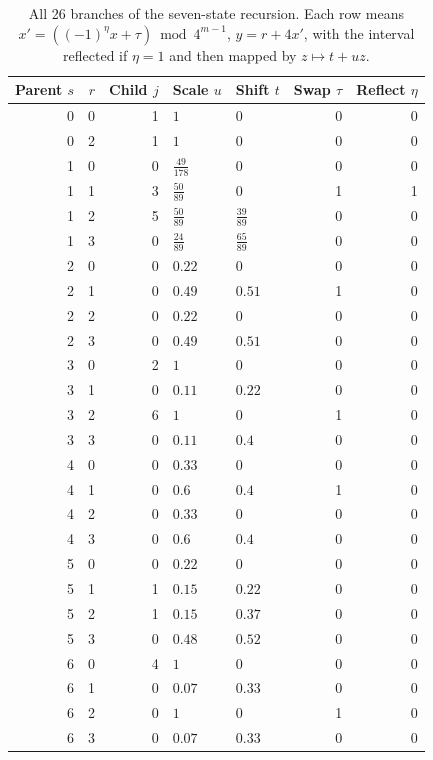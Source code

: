\documentclass[11pt]{article}
\theoremstyle{definition}
\theoremstyle{remark}
\begin{document}
\begin{table}[htbp]
\centering\small
\renewcommand{\arraystretch}{1.13}
\begin{tabular}{rrrllrr}\toprule
Parent $s$&$r$&Child $j$&Scale $u$&Shift $t$&Swap $\tau$&Reflect $\eta$\\\midrule
0&0&1&$1$&$0$&0&0\\
0&2&1&$1$&$0$&0&0\\
\midrule
1&0&0&$\frac{49}{178}$&$0$&0&0\\
1&1&3&$\frac{50}{89}$&$0$&1&1\\
1&2&5&$\frac{50}{89}$&$\frac{39}{89}$&0&0\\
1&3&0&$\frac{24}{89}$&$\frac{65}{89}$&0&0\\
\midrule
2&0&0&$0.22$&$0$&0&0\\
2&1&0&$0.49$&$0.51$&1&0\\
2&2&0&$0.22$&$0$&0&0\\
2&3&0&$0.49$&$0.51$&0&0\\
\midrule
3&0&2&$1$&$0$&0&0\\
3&1&0&$0.11$&$0.22$&0&0\\
3&2&6&$1$&$0$&1&0\\
3&3&0&$0.11$&$0.4$&0&0\\
\midrule
4&0&0&$0.33$&$0$&0&0\\
4&1&0&$0.6$&$0.4$&1&0\\
4&2&0&$0.33$&$0$&0&0\\
4&3&0&$0.6$&$0.4$&0&0\\
\midrule
5&0&0&$0.22$&$0$&0&0\\
5&1&1&$0.15$&$0.22$&0&0\\
5&2&1&$0.15$&$0.37$&0&0\\
5&3&0&$0.48$&$0.52$&0&0\\
\midrule
6&0&4&$1$&$0$&0&0\\
6&1&0&$0.07$&$0.33$&0&0\\
6&2&0&$1$&$0$&1&0\\
6&3&0&$0.07$&$0.33$&0&0\\
\bottomrule\end{tabular}
\caption{All 26 branches of the seven-state recursion. Each row means
$x'=((-1)^\eta x+\tau)\bmod4^{m-1}$, $y=r+4x'$, with the interval
reflected if $\eta=1$ and then mapped by $z\mapsto t+uz$.}
\label{tab:transitions}
\end{table}

\clearpage
\end{document}
